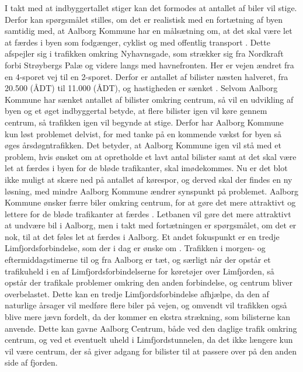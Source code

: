 \newline \indent{     }  I takt med at indbyggertallet stiger kan det formodes at antallet af biler vil stige. Derfor kan spørgsmålet stilles, om det er realistisk med en fortætning af byen samtidig med, at Aalborg Kommune har en målsætning om, at det skal være let at færdes i byen som fodgænger, cyklist og med offentlig transport \citep{kommuneplan3}. Dette afspejler sig i trafikken omkring Nyhavnsgade, som strækker sig fra Nordkraft forbi Strøybergs Palæ og videre langs med havnefronten. Her er vejen ændret fra en 4-sporet vej til en 2-sporet. Derfor er antallet af bilister næsten halveret, fra 20.500 (ÅDT) til 11.000 (ÅDT), og hastigheden er sænket \citep[ s. 6]{lokalplan}. Selvom Aalborg Kommune har sænket antallet af bilister omkring centrum, så vil en udvikling af byen og et øget indbyggertal betyde, at flere bilister igen vil køre gennem centrum, så trafikken igen vil begynde at stige. Derfor har Aalborg Kommune kun løst problemet delvist, for med tanke på en kommende vækst for byen så øges årsdøgntrafikken. Det betyder, at Aalborg Kommune igen vil stå med et problem, hvis ønsket om at opretholde et lavt antal bilister samt at det skal være let at færdes i byen for de bløde trafikanter, skal imødekommes. Nu er det blot ikke muligt at skære ned på antallet af kørespor, og derved skal der findes en ny løsning, med mindre Aalborg Kommune ændrer synspunkt på problemet.
\newline \indent{     }  Aalborg Kommune ønsker færre biler omkring centrum, for at gøre det mere attraktivt og lettere for de bløde trafikanter at færdes \citep{aalborgletbane} \citep{nordjyske}. Letbanen vil gøre det mere attraktivt at undvære bil i Aalborg, men i takt med fortætningen er spørgsmålet, om det er nok, til at det føles let at færdes i Aalborg. Et andet fokuspunkt er en tredje Limfjordsforbindelse, som der i dag er ønske om \citep{limfjordsforbindelsen}. Trafikken i morgen- og eftermiddagstimerne til og fra Aalborg er tæt, og særligt når der opstår et trafikuheld i en af Limfjordsforbindelserne for køretøjer over Limfjorden, så opstår der trafikale problemer omkring den anden forbindelse, og centrum bliver overbelastet. Dette kan en tredje Limfjordsforbindelse afhjælpe, da den af naturlige årsager vil medføre flere biler på vejen, og omvendt vil trafikken også blive mere jævn fordelt, da der kommer en ekstra strækning, som bilisterne kan anvende. Dette kan gavne Aalborg Centrum, både ved den daglige trafik omkring centrum, og ved et eventuelt uheld i Limfjordstunnelen, da det ikke længere kun vil være centrum, der så giver adgang for bilister til at passere over på den anden side af fjorden.
